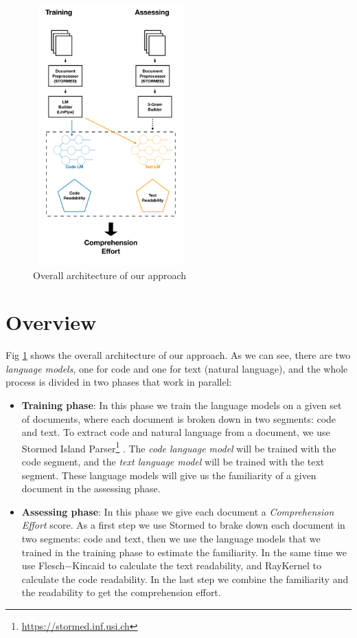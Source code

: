 \documentclass[12pt,mscthesis]{usiinfthesis}
\begin{document}
	\begin{figure}[H]
	\centering
	\includegraphics[width=6cm, height=10cm]{overview}
	\caption{Overall architecture of our approach}
	\label{overview}
	\end{figure}
	
	\section{Overview}

	Fig \ref{overview} shows the overall architecture of our approach. As we can see, there are two \emph{language models}, one for code and one for text (natural language), and the whole process is divided in two phases that work in parallel: 
	\begin{itemize}

		\item \textbf{Training phase}: In this phase we train the language models on a given set of documents, where each document is broken down in two segments: code and text. To extract code and natural language from a document, we use Stormed Island Parser\footnote{\url{https://stormed.inf.usi.ch}} \cite{Ponz2015a}. The \emph{code language model} will be trained with the code segment, and the \emph{text language model} will be trained with the text segment. These language models will give us the familiarity of a given document in the assessing phase.


		\item \textbf{Assessing phase}: In this phase we give each document a \emph{Comprehension Effort} score. As a first step we use Stormed \cite{Ponz2015a} to brake down each document in two segments: code and text, then we use the language models that we trained in the training phase to estimate the familiarity. In the same time we use Flesch$-$Kincaid\cite{Kincaid} to calculate the text readability, and RayKernel \cite{Buse:2010:LMC:1850489.1850615} to calculate the code readability. In the last step we combine the familiarity and the readability to get the comprehension effort.
	
	\end{itemize}
\end{document}
